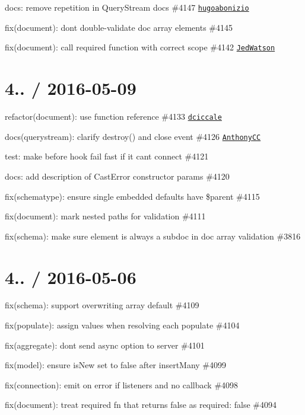 \begin{DoxyItemize}
\item docs\+: remove repetition in Query\+Stream docs \#4147 \href{https://github.com/hugoabonizio}{\tt hugoabonizio}
\item fix(document)\+: dont double-\/validate doc array elements \#4145
\item fix(document)\+: call required function with correct scope \#4142 \href{https://github.com/JedWatson}{\tt Jed\+Watson}
\end{DoxyItemize}

\section*{4.. / 2016-\/05-\/09 }


\begin{DoxyItemize}
\item refactor(document)\+: use function reference \#4133 \href{https://github.com/dciccale}{\tt dciccale}
\item docs(querystream)\+: clarify {\ttfamily destroy()} and close event \#4126 \href{https://github.com/AnthonyCC}{\tt Anthony\+CC}
\item test\+: make before hook fail fast if it can\textquotesingle{}t connect \#4121
\item docs\+: add description of Cast\+Error constructor params \#4120
\item fix(schematype)\+: ensure single embedded defaults have \$parent \#4115
\item fix(document)\+: mark nested paths for validation \#4111
\item fix(schema)\+: make sure element is always a subdoc in doc array validation \#3816
\end{DoxyItemize}

\section*{4.. / 2016-\/05-\/06 }


\begin{DoxyItemize}
\item fix(schema)\+: support overwriting array default \#4109
\item fix(populate)\+: assign values when resolving each populate \#4104
\item fix(aggregate)\+: dont send async option to server \#4101
\item fix(model)\+: ensure is\+New set to false after insert\+Many \#4099
\item fix(connection)\+: emit on error if listeners and no callback \#4098
\item fix(document)\+: treat required fn that returns false as required\+: false \#4094
\end{DoxyItemize}

